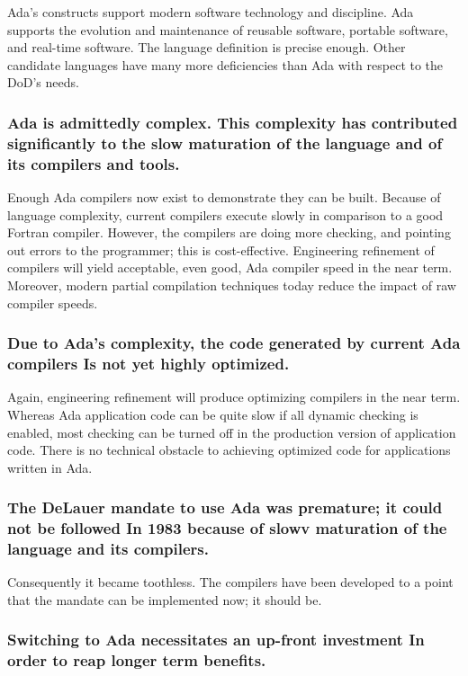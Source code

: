 \documentclass[12pt]{article}
\begin{document}
Ada's constructs support modern software technology and discipline. Ada
supports the evolution and maintenance of reusable software, portable software,
and real-time software.  The language definition is precise enough.  Other
candidate languages have many more deficiencies than Ada with respect to the
DoD's needs.

\subsubsection*{Ada is admittedly complex. This complexity has contributed
significantly to the slow maturation of the language and of its compilers and
tools.}

Enough Ada compilers now exist to demonstrate they can be built. Because of
language complexity, current compilers execute slowly in comparison to a good
Fortran compiler. However, the compilers are doing more checking, and pointing
out errors to the programmer; this is cost-effective. Engineering refinement of
compilers will yield acceptable, even good, Ada compiler speed in the near
term. Moreover, modern partial compilation techniques today reduce the impact
of raw compiler speeds.

\subsubsection*{Due to Ada's complexity, the code generated by current Ada
compilers Is not yet highly optimized.}

Again, engineering refinement will produce optimizing compilers in the near
term. Whereas Ada application code can be quite slow if all dynamic checking
is enabled, most checking can be turned off in the production version of
application code. There is no technical obstacle to achieving optimized code
for applications written in Ada.

\subsubsection*{The DeLauer mandate to use Ada was premature; it could not be
followed In 1983 because of slowv maturation of the language and its
compilers.}

Consequently it became toothless. The compilers have been developed to a point that
the mandate can be implemented now; it should be.

\subsubsection*{Switching to Ada necessitates an up-front investment In order
to reap longer term benefits.}
\end{document}
